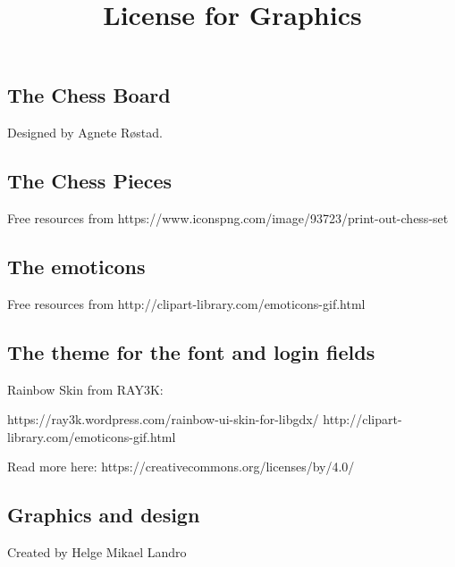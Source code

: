\documentclass{article}
\title{License for Graphics}
\begin{document}
\date{}
\maketitle
{}

\subsection*{ The Chess Board }
\begin{description}
\item Designed by Agnete Røstad.
\end{description}

\subsection*{ The Chess Pieces }
\begin{description}
\item Free resources from https://www.iconspng.com/image/93723/print-out-chess-set
\end{description}

\subsection*{ The emoticons }
\begin{description}
\item Free resources from http://clipart-library.com/emoticons-gif.html
\end{description}

\subsection*{ The theme for the font and login fields }
\begin{description}
\item Rainbow Skin from RAY3K:
\item https://ray3k.wordpress.com/rainbow-ui-skin-for-libgdx/ http://clipart-library.com/emoticons-gif.html
\item
Read more here: https://creativecommons.org/licenses/by/4.0/
\end{description}

\subsection*{ Graphics and design }
\begin{description}
\item Created by Helge Mikael Landro
\end{description}
\end{document}
